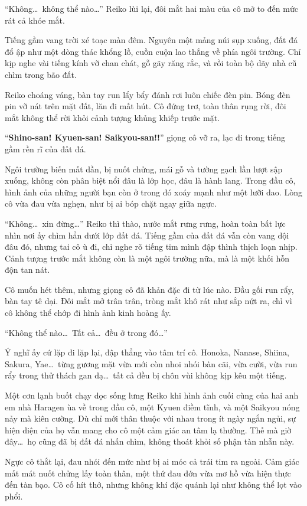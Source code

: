 \documentclass[../main.tex]{subfiles}
\begin{document}
``Không\dots\ không thể nào\dots'' Reiko lùi lại, đôi mắt hai màu của cô mở to đến mức rát cả khóe mắt.

Tiếng gầm vang trời xé toạc màn đêm. Nguyên một mảng núi sụp xuống, đất đá đổ ập như một dòng thác khổng lồ, cuồn cuộn lao thẳng về phía ngôi trường. Chỉ kịp nghe vài tiếng kính vỡ chan chát, gỗ gãy răng rắc, và rồi toàn bộ dãy nhà cũ chìm trong bão đất.

Reiko choáng váng, bàn tay run lẩy bẩy đánh rơi luôn chiếc đèn pin. Bóng đèn pin vỡ nát trên mặt đất, lăn đi mất hút. Cô đứng trơ, toàn thân rụng rời, đôi mắt không thể rời khỏi cảnh tượng khủng khiếp trước mặt.

``\textbf{Shino-san! Kyuen-san! Saikyou-san!!}'' giọng cô vỡ ra, lạc đi trong tiếng gầm rền rĩ của đất đá.

Ngôi trường biến mất dần, bị nuốt chửng, mái gỗ và tường gạch lần lượt sập xuống, không còn phân biệt nổi đâu là lớp học, đâu là hành lang. Trong đầu cô, hình ảnh của những người bạn còn ở trong đó xoáy mạnh như một lưỡi dao. Lòng cô vừa đau vừa nghẹn, như bị ai bóp chặt ngay giữa ngực.

``Không\dots\ xin đừng\dots'' Reiko thì thào, nước mắt rưng rưng, hoàn toàn bất lực nhìn nơi ấy chìm hẳn dưới lớp đất đá. Tiếng gầm của đất đá vẫn còn vang dội đâu đó, nhưng tai cô ù đi, chỉ nghe rõ tiếng tim mình đập thình thịch loạn nhịp. Cảnh tượng trước mắt không còn là một ngôi trường nữa, mà là một khối hỗn độn tan nát.

Cô muốn hét thêm, nhưng giọng cô đã khản đặc đi từ lúc nào. Đầu gối run rẩy, bàn tay tê dại. Đôi mắt mở trân trân, tròng mắt khô rát như sắp nứt ra, chỉ vì cô không thể chớp đi hình ảnh kinh hoàng ấy.

``Không thể nào\dots\ Tất cả\dots\ đều ở trong đó\dots''

Ý nghĩ ấy cứ lặp đi lặp lại, đập thẳng vào tâm trí cô. Honoka, Nanase, Shiina, Sakura, Yae\dots\ từng gương mặt vừa mới còn nhoi nhói bàn cãi, vừa cười, vừa run rẩy trong thử thách gan dạ\dots\ tất cả đều bị chôn vùi không kịp kêu một tiếng.

Một cơn lạnh buốt chạy dọc sống lưng Reiko khi hình ảnh cuối cùng của hai anh em nhà Haragen ùa về trong đầu cô, một Kyuen điềm tĩnh, và một Saikyou nóng nảy mà kiên cường. Dù chỉ mới thân thuộc với nhau trong ít ngày ngắn ngủi, sự hiện diện của họ vẫn mang cho cô một cảm giác an tâm lạ thường. Thế mà giờ đây\dots\ họ cũng đã bị đất đá nhấn chìm, không thoát khỏi số phận tàn nhẫn này.

Ngực cô thắt lại, đau nhói đến mức như bị ai móc cả trái tim ra ngoài. Cảm giác mất mát nuốt chửng lấy toàn thân, một thứ đau đớn vừa mơ hồ vừa hiện thực đến tàn bạo. Cô cố hít thở, nhưng không khí đặc quánh lại như không thể lọt vào phổi.
\end{document}
